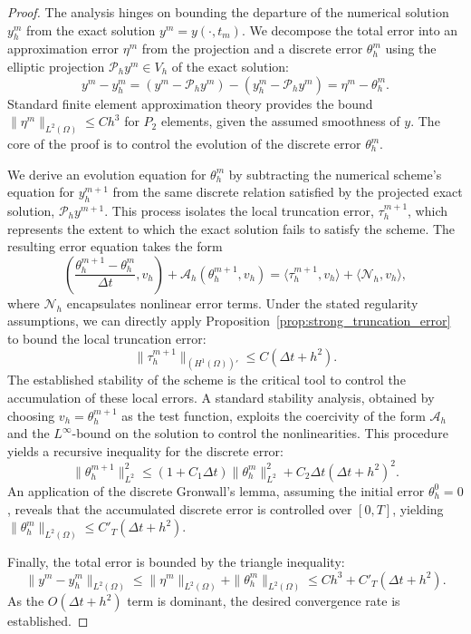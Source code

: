 \documentclass[10pt,a4paper]{amsart}
\newcommand{\inner}[2]{\left( #1, #2 \right)}
\begin{document}
\begin{proof}
The analysis hinges on bounding the departure of the numerical solution $y_h^m$ from the exact solution $y^m = y(\cdot, t_m)$. We decompose the total error into an approximation error $\eta^m$ from the projection and a discrete error $\theta_h^m$ using the elliptic projection $\mathcal{P}_h y^m \in V_h$ of the exact solution:
$$y^m - y_h^m = (y^m - \mathcal{P}_h y^m) - (y_h^m - \mathcal{P}_h y^m) = \eta^m - \theta_h^m.$$
Standard finite element approximation theory provides the bound $\|\eta^m\|_{L^2(\Omega)} \le C h^3$ for $P_2$ elements, given the assumed smoothness of $y$. The core of the proof is to control the evolution of the discrete error $\theta_h^m$.

We derive an evolution equation for $\theta_h^m$ by subtracting the numerical scheme's equation for $y_h^{m+1}$ from the same discrete relation satisfied by the projected exact solution, $\mathcal{P}_h y^{m+1}$. This process isolates the local truncation error, $\tau_h^{m+1}$, which represents the extent to which the exact solution fails to satisfy the scheme. The resulting error equation takes the form
$$\inner{\frac{\theta_h^{m+1} - \theta_h^m}{\Delta t}}{v_h} + \mathcal{A}_h(\theta_h^{m+1}, v_h) = \langle \tau_h^{m+1}, v_h \rangle + \langle \mathcal{N}_h, v_h \rangle,$$
where $\mathcal{N}_h$ encapsulates nonlinear error terms. Under the stated regularity assumptions, we can directly apply Proposition~\ref{prop:strong_truncation_error} to bound the local truncation error:
$$ \| \tau_h^{m+1} \|_{(H^1(\Omega))'} \le C(\Delta t + h^2). $$
The established stability of the scheme is the critical tool to control the accumulation of these local errors. A standard stability analysis, obtained by choosing $v_h = \theta_h^{m+1}$ as the test function, exploits the coercivity of the form $\mathcal{A}_h$ and the $L^\infty$-bound on the solution to control the nonlinearities. This procedure yields a recursive inequality for the discrete error:
$$\|\theta_h^{m+1}\|^2_{L^2} \le (1 + C_1 \Delta t) \|\theta_h^m\|^2_{L^2} + C_2 \Delta t (\Delta t + h^2)^2.$$
An application of the discrete Gronwall's lemma, assuming the initial error $\theta_h^0 = 0$, reveals that the accumulated discrete error is controlled over $[0,T]$, yielding $\|\theta_h^m\|_{L^2(\Omega)} \le C'_T (\Delta t + h^2)$.

Finally, the total error is bounded by the triangle inequality:
$$\|y^m - y_h^m\|_{L^2(\Omega)} \le \|\eta^m\|_{L^2(\Omega)} + \|\theta_h^m\|_{L^2(\Omega)} \le C h^3 + C'_T(\Delta t + h^2).$$
As the $O(\Delta t + h^2)$ term is dominant, the desired convergence rate is established.
\end{proof}
\end{document}
